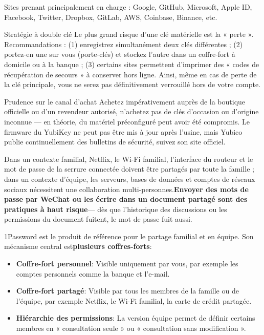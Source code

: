 Sites prenant principalement en charge : Google, GitHub, Microsoft, Apple ID, Facebook, Twitter, Dropbox, GitLab, AWS, Coinbase, Binance, etc.

\begin{tcbinfo}{Stratégie à double clé}
Le plus grand risque d'une clé matérielle est la « perte ». Recommandations : (1) enregistrez simultanément deux clés différentes ; (2) portez-en une sur vous (porte-clés) et stockez l'autre dans un coffre-fort à domicile ou à la banque ; (3) certains sites permettent d'imprimer des « codes de récupération de secours » à conserver hors ligne. Ainsi, même en cas de perte de la clé principale, vous ne serez pas définitivement verrouillé hors de votre compte.

\end{tcbinfo}

\begin{tcbwarn}{Prudence sur le canal d'achat}
Achetez impérativement auprès de la boutique officielle ou d'un revendeur autorisé, n'achetez pas de clés d'occasion ou d'origine inconnue — en théorie, du matériel préconfiguré peut avoir été compromis. Le firmware du YubiKey ne peut pas être mis à jour après l'usine, mais Yubico publie continuellement des bulletins de sécurité, suivez son site officiel.

\end{tcbwarn}


Dans un contexte familial, Netflix, le Wi-Fi familial, l'interface du routeur et le mot de passe de la serrure connectée doivent être partagés par toute la famille ; dans un contexte d'équipe, les serveurs, bases de données et comptes de réseaux sociaux nécessitent une collaboration multi-personnes.\textbf{Envoyer des mots de passe par WeChat ou les écrire dans un document partagé sont des pratiques à haut risque}— dès que l'historique des discussions ou les permissions du document fuitent, le mot de passe fuit aussi.


1Password est le produit de référence pour le partage familial et en équipe. Son mécanisme central est\textbf{plusieurs coffres-forts}:

\begin{itemize}
  \item \textbf{Coffre-fort personnel}: Visible uniquement par vous, par exemple les comptes personnels comme la banque et l'e-mail.
  \item \textbf{Coffre-fort partagé}: Visible par tous les membres de la famille ou de l'équipe, par exemple Netflix, le Wi-Fi familial, la carte de crédit partagée.
  \item \textbf{Hiérarchie des permissions}: La version équipe permet de définir certains membres en « consultation seule » ou « consultation sans modification ».
\end{itemize}

